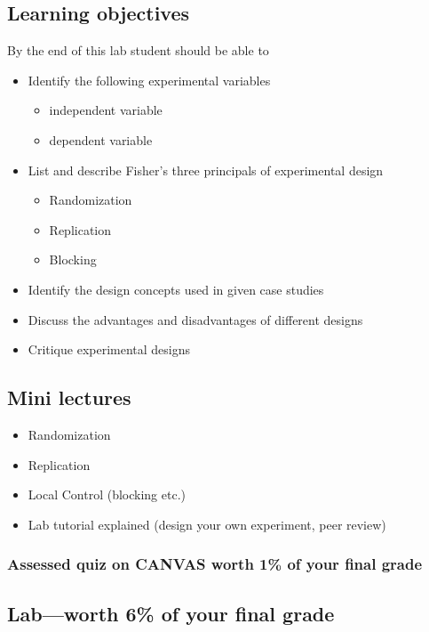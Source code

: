 \documentclass{article}
\begin{document}
\subsection*{Learning objectives}
By the end of this lab student should be able to
\begin{itemize}
\item Identify the following experimental variables
  \begin{itemize}
      \item independent variable
      \item dependent variable
        \end{itemize}
\item List and describe Fisher's three principals of experimental design
  \begin{itemize}
       \item Randomization
       \item Replication
       \item Blocking
       \end{itemize}  
   \item Identify the design concepts used in given case studies
   \item Discuss the advantages and disadvantages of different designs
   \item Critique experimental designs
\end{itemize}

\subsection*{Mini lectures}

\begin{itemize}
\item Randomization
\item Replication
\item Local Control (blocking etc.)
\item Lab tutorial explained (design your own experiment, peer review)
\end{itemize}

\subsubsection*{Assessed quiz on CANVAS worth 1\% of your final grade}


\subsection*{Lab---worth 6\% of your final grade}
\end{document}
